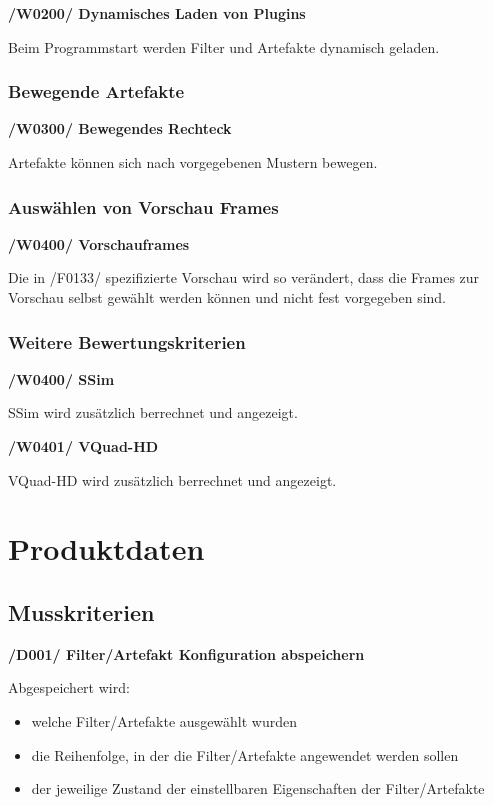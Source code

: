 \documentclass[parskip=full]{scrartcl}
\begin{document}
\textbf{/W0200/ Dynamisches Laden von Plugins}

Beim Programmstart werden Filter und Artefakte dynamisch geladen.

\subsubsection{Bewegende Artefakte}

\textbf{/W0300/ Bewegendes Rechteck}

Artefakte können sich nach vorgegebenen Mustern bewegen.

\subsubsection{Auswählen von Vorschau Frames}

\textbf{/W0400/ Vorschauframes}

Die in /F0133/ spezifizierte Vorschau wird so verändert, dass die Frames zur Vorschau selbst gewählt werden können und nicht fest vorgegeben sind.

\subsubsection{Weitere Bewertungskriterien}

\textbf{/W0400/ SSim}

SSim wird zusätzlich berrechnet und angezeigt.

\textbf{/W0401/ VQuad-HD}

VQuad-HD wird zusätzlich berrechnet und angezeigt.


\newpage
\section{Produktdaten}
\subsection{Musskriterien}
\textbf{/D001/ Filter/Artefakt Konfiguration abspeichern}

Abgespeichert wird:
\begin{itemize}
\item welche Filter/Artefakte ausgewählt wurden
\item die Reihenfolge, in der die Filter/Artefakte angewendet werden sollen
\item der jeweilige Zustand der einstellbaren Eigenschaften der Filter/Artefakte
\end{itemize}
\end{document}
